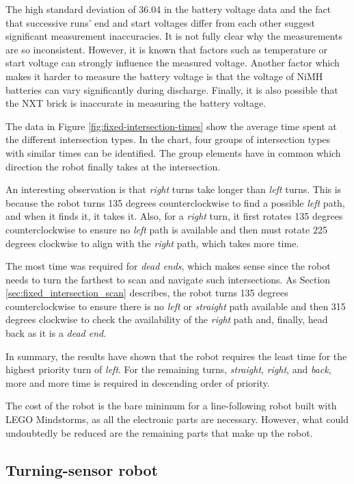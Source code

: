 The high standard deviation of 36.04 in the battery voltage data  and the fact that successive runs' end and start voltages differ from each other suggest significant measurement inaccuracies. It is not fully clear why the measurements are so inconsistent. However, it is known that factors such as temperature or start voltage can strongly influence the measured voltage. Another factor which makes it harder to measure the battery voltage is that the voltage of NiMH batteries can vary significantly during discharge. Finally, it is also possible that the NXT brick is inaccurate in measuring the battery voltage.

The data in Figure \ref{fig:fixed-intersection-times} show the average time spent at the different intersection types. In the chart, four groups of intersection types with similar times can be identified. The group elements have in common which direction the robot finally takes at the intersection.

An interesting observation is that \textit{right} turns take longer than \textit{left} turns. This is because the robot turns 135 degrees counterclockwise to find a possible \textit{left} path, and when it finds it, it takes it. Also, for a \textit{right} turn, it first rotates 135 degrees counterclockwise to ensure no \textit{left} path is available and then must rotate 225 degrees clockwise to align with the \textit{right} path, which takes more time.

The most time was required for \textit{dead ends}, which makes sense since the robot needs to turn the farthest to scan and navigate such intersections. As Section \ref{sec:fixed_intersection_scan} describes, the robot turns 135 degrees counterclockwise to ensure there is no \textit{left} or \textit{straight} path available and then 315 degrees clockwise to check the availability of the \textit{right} path and, finally, head back as it is a \textit{dead end}.

In summary, the results have shown that the robot requires the least time for the highest priority turn of \textit{left}. For the remaining turns, \textit{straight}, \textit{right}, and \textit{back}, more and more time is required in descending order of priority.

The cost of the robot is the bare minimum for a line-following robot built with LEGO Mindstorms, as all the electronic parts are necessary. However, what could undoubtedly be reduced are the remaining parts that make up the robot.

\subsection{Turning-sensor robot}

